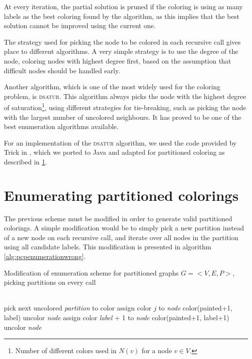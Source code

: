 At every iteration, the partial solution is pruned if the coloring is using as many labels as the best coloring found by the algorithm, as this implies that the best solution cannot be improved using the current one.

The strategy used for picking the node to be colored in each recursive call gives place to different algorithms. A very simple strategy is to use the degree of the node, coloring nodes with highest degree first, based on the assumption that difficult nodes should be handled early.

Another algorithm, which is one of the most widely used for the coloring problem, is \textsc{dsatur}\cite{brelaz1979new}. This algorithm always picks the node with the highest degree of saturation\footnote{Number of different colors used in $N(v)$ for a node $v \in V$.}, using different strategies for tie-breaking, such as picking the node with the largest number of uncolored neighbours\cite{sewell1996improved}. It has proved to be one of the best enumeration algorithms available.

For an implementation of the \textsc{dsatur} algorithm, we used the code provided by Trick in \cite{trickdsatur}, which we ported to Java and adapted for partitioned coloring as described in \ref{subsec:heur:enumpcp}.

\section{Enumerating partitioned colorings}
\label{subsec:heur:enumpcp}

The previous scheme must be modified in order to generate valid partitioned colorings. A simple modification would be to simply pick a new partition instead of a new node on each recursive call, and iterate over all nodes in the partition using all candidate labels. This modification is presented in algorithm \ref{alg:pcpenumerationwrong}. 

\begin{algorithm}
\caption{Modification of enumeration scheme for partitioned graphs $G = <V,E,P>$, picking partitions on every call}
\label{alg:pcpenumerationwrong}

\begin{algorithmic}
	\STATE [...] \\
		\STATE pick next uncolored \textit{partition} to color		
					\STATE assign color $j$ to \textit{node}
					\CALL color(painted+1, label)
					\STATE uncolor \textit{node}
				\ENDIF
			\ENDFOR
			\STATE assign color \textit{label} + 1 to \textit{node}
			\CALL color(painted+1, label+1)
			\STATE uncolor \textit{node}
		\ENDFOR
	\ENDPROC	
\end{algorithmic}
\end{algorithm}

